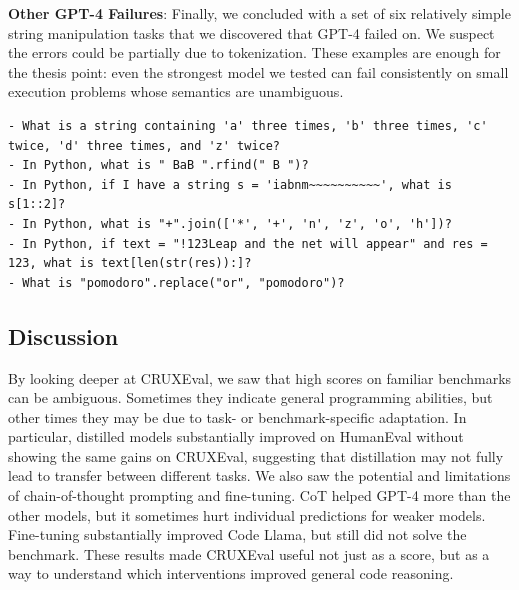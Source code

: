 \textbf{Other GPT-4 Failures}: Finally, we concluded with a set of six relatively simple string manipulation tasks that we discovered that GPT-4 failed on. We suspect the errors could be partially due to tokenization.
These examples are enough for the thesis point: even the strongest model we tested can fail consistently on small execution problems whose semantics are unambiguous.

\begin{lstlisting}
- What is a string containing 'a' three times, 'b' three times, 'c' twice, 'd' three times, and 'z' twice?
- In Python, what is " BaB ".rfind(" B ")?
- In Python, if I have a string s = 'iabnm~~~~~~~~~~', what is s[1::2]?
- In Python, what is "+".join(['*', '+', 'n', 'z', 'o', 'h'])?
- In Python, if text = "!123Leap and the net will appear" and res = 123, what is text[len(str(res)):]?
- What is "pomodoro".replace("or", "pomodoro")?
\end{lstlisting}

\subsection{Discussion}
By looking deeper at CRUXEval, we saw that high scores on familiar benchmarks can be ambiguous.
Sometimes they indicate general programming abilities, but other times they may be due to task-
or benchmark-specific adaptation. In particular, distilled models substantially improved on
HumanEval without showing the same gains on CRUXEval, suggesting that distillation may not fully
lead to transfer between different tasks. We also saw the potential and limitations of chain-of-thought prompting and fine-tuning. CoT helped
GPT-4 more than the other models, but it sometimes hurt individual predictions for weaker models.
Fine-tuning substantially improved Code Llama, but still did not solve the benchmark. These results
made CRUXEval useful not just as a score, but as a way to understand which interventions improved
general code reasoning.
